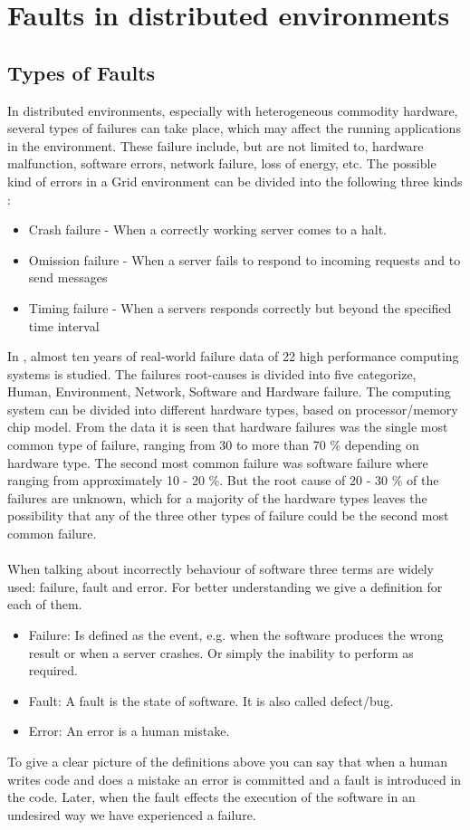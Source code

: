 \documentclass{cslthse-msc}
\begin{document}
\section{Faults in distributed environments}
\subsection{Types of Faults}
In distributed environments, especially with heterogeneous commodity hardware, several types of failures can take place, which may affect the running applications in the environment. These failure include, but are not limited to, hardware malfunction, software errors, network failure, loss of energy, etc. The possible kind of errors in a Grid environment can be divided into the following three kinds \cite{effTaskReplMobGrid}:
\begin{itemize}
\item Crash failure - When a correctly working server comes to a halt.
\item Omission failure - When a server fails to respond to incoming requests and to send messages
\item Timing failure - When a servers responds correctly but beyond the specified time interval
\end{itemize}

In \cite{studyOfFailures}, almost ten years of real-world failure data of 22 high performance computing systems is studied. The failures root-causes is divided into five categorize, Human, Environment, Network, Software and Hardware failure. The computing system can be divided into different hardware types, based on processor/memory chip model. From the data it is seen that hardware failures was the single most common type of failure, ranging from 30 to more than 70 \% depending on hardware type. The second most common failure was software failure where ranging from approximately 10 - 20 \%. But the root cause of 20 - 30 \% of the failures are unknown, which for a majority of the hardware types leaves the possibility that any of the three other types of failure could be the second most common failure.
\\\\
When talking about incorrectly behaviour of software three terms are widely used: failure, fault and error. For better understanding we give a definition for each of them.
\begin{itemize}
\item Failure: Is defined as the event, e.g. when the software produces the wrong result or when a server crashes. Or simply the inability to perform as required.
\item Fault: A fault is the state of software. It is also called defect/bug.
\item Error: An error is a human mistake.
\end{itemize} 
To give a clear picture of the definitions above you can say that when a human writes code and does a mistake an error is committed and a fault is introduced in the code. Later, when the fault effects the execution of the software in an undesired way we have experienced a failure. 
\end{document}
